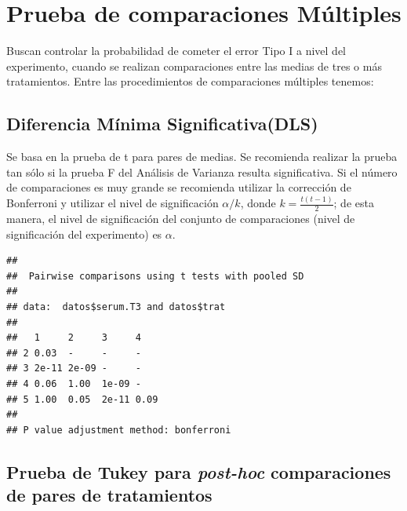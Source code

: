 \documentclass[]{book}
\newenvironment{Shaded}{\begin{snugshade}}{\end{snugshade}}
\newcommand{\KeywordTok}[1]{\textcolor[rgb]{0.13,0.29,0.53}{\textbf{#1}}}
\newcommand{\DataTypeTok}[1]{\textcolor[rgb]{0.13,0.29,0.53}{#1}}
\newcommand{\StringTok}[1]{\textcolor[rgb]{0.31,0.60,0.02}{#1}}
\newcommand{\OperatorTok}[1]{\textcolor[rgb]{0.81,0.36,0.00}{\textbf{#1}}}
\newcommand{\NormalTok}[1]{#1}
\begin{document}
\section{Prueba de comparaciones
Múltiples}\label{prueba-de-comparaciones-multiples}

Buscan controlar la probabilidad de cometer el error Tipo I a nivel del
experimento, cuando se realizan comparaciones entre las medias de tres o
más tratamientos. Entre las procedimientos de comparaciones múltiples
tenemos:

\subsection{Diferencia Mínima
Significativa(DLS)}\label{diferencia-minima-significativadls}

Se basa en la prueba de t para pares de medias. Se recomienda realizar
la prueba tan sólo si la prueba F del Análisis de Varianza resulta
significativa. Si el número de comparaciones es muy grande se recomienda
utilizar la corrección de Bonferroni y utilizar el nivel de
significación \(\alpha/k\), donde \(k=\frac{t(t-1)}{2}\); de esta
manera, el nivel de significación del conjunto de comparaciones (nivel
de significación del experimento) es \(\alpha\).

\begin{Shaded}
\end{Shaded}

\begin{verbatim}
## 
##  Pairwise comparisons using t tests with pooled SD 
## 
## data:  datos$serum.T3 and datos$trat 
## 
##   1     2     3     4   
## 2 0.03  -     -     -   
## 3 2e-11 2e-09 -     -   
## 4 0.06  1.00  1e-09 -   
## 5 1.00  0.05  2e-11 0.09
## 
## P value adjustment method: bonferroni
\end{verbatim}

\subsection{\texorpdfstring{Prueba de Tukey para \emph{post-hoc}
comparaciones de pares de
tratamientos}{Prueba de Tukey para post-hoc comparaciones de pares de tratamientos}}\label{prueba-de-tukey-para-post-hoc-comparaciones-de-pares-de-tratamientos}
\end{document}
